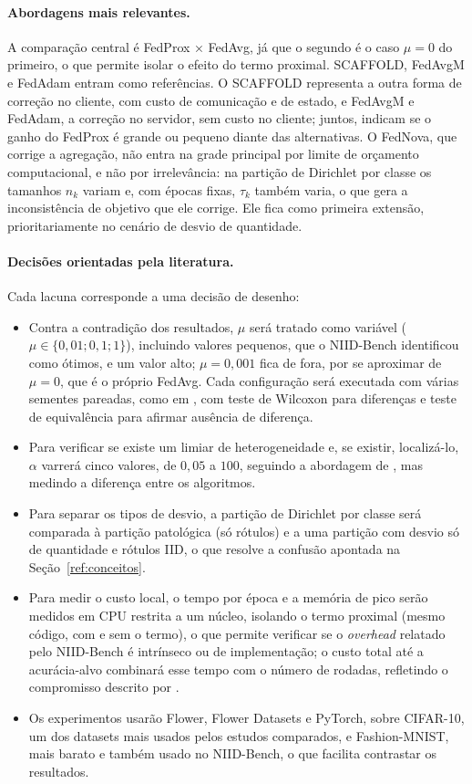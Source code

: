 \paragraph{Abordagens mais relevantes.} A comparação central é FedProx × FedAvg, já que o segundo é o caso $\mu = 0$ do primeiro, o que permite isolar o efeito do termo proximal. SCAFFOLD, FedAvgM e FedAdam entram como referências. O SCAFFOLD representa a outra forma de correção no cliente, com custo de comunicação e de estado, e FedAvgM e FedAdam, a correção no servidor, sem custo no cliente; juntos, indicam se o ganho do FedProx é grande ou pequeno diante das alternativas. O FedNova, que corrige a agregação, não entra na grade principal por limite de orçamento computacional, e não por irrelevância: na partição de Dirichlet por classe os tamanhos $n_k$ variam e, com épocas fixas, $\tau_k$ também varia, o que gera a inconsistência de objetivo que ele corrige. Ele fica como primeira extensão, prioritariamente no cenário de desvio de quantidade.

\paragraph{Decisões orientadas pela literatura.} Cada lacuna corresponde a uma decisão de desenho:
\begin{itemize}[leftmargin=*, itemsep=1pt]
    \item Contra a contradição dos resultados, $\mu$ será tratado como variável ($\mu \in \{0{,}01; 0{,}1; 1\}$), incluindo valores pequenos, que o NIID-Bench identificou como ótimos, e um valor alto; $\mu = 0{,}001$ fica de fora, por se aproximar de $\mu = 0$, que é o próprio FedAvg. Cada configuração será executada com várias sementes pareadas, como em \citet{enang2026optimiser}, com teste de Wilcoxon \citep{wilcoxon1945} para diferenças e teste de equivalência \citep{schuirmann1987tost} para afirmar ausência de diferença.
    \item Para verificar se existe um limiar de heterogeneidade e, se existir, localizá-lo, $\alpha$ varrerá cinco valores, de $0{,}05$ a $100$, seguindo a abordagem de \citet{hsu2019fedavgm}, mas medindo a diferença entre os algoritmos.
    \item Para separar os tipos de desvio, a partição de Dirichlet por classe será comparada à partição patológica (só rótulos) e a uma partição com desvio só de quantidade e rótulos IID, o que resolve a confusão apontada na Seção~\ref{ref:conceitos}.
    \item Para medir o custo local, o tempo por época e a memória de pico serão medidos em CPU restrita a um núcleo, isolando o termo proximal (mesmo código, com e sem o termo), o que permite verificar se o \textit{overhead} relatado pelo NIID-Bench é intrínseco ou de implementação; o custo total até a acurácia-alvo combinará esse tempo com o número de rodadas, refletindo o compromisso descrito por \citet{wang2019adaptive}.
    \item Os experimentos usarão Flower, Flower Datasets e PyTorch, sobre CIFAR-10, um dos datasets mais usados pelos estudos comparados, e Fashion-MNIST, mais barato e também usado no NIID-Bench, o que facilita contrastar os resultados.
\end{itemize}

